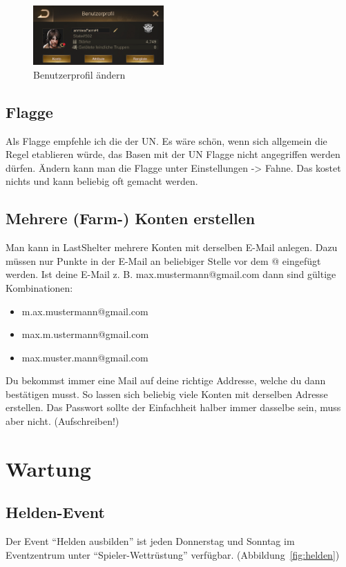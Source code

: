 \documentclass[fontsize=12pt,a4paper]{scrartcl}[2003/01/01]
\begin{document}
\begin{figure}[H] 
  \centering
     \includegraphics[width=5cm]{Bilder/IMG_E0006.JPG}
  \caption{Benutzerprofil ändern}
  \label{fig:benutzer}
\end{figure}

\subsection{Flagge}
Als Flagge empfehle ich die der UN. Es wäre schön, wenn sich allgemein die Regel etablieren würde, das Basen mit der UN Flagge nicht angegriffen werden dürfen.
Ändern kann man die Flagge unter Einstellungen -> Fahne. Das kostet nichts und kann beliebig oft gemacht werden.

\subsection{Mehrere (Farm-) Konten erstellen}
Man kann in LastShelter mehrere Konten mit derselben E-Mail anlegen. Dazu müssen nur Punkte in der E-Mail an beliebiger Stelle vor dem @ eingefügt werden.
Ist deine E-Mail z. B. max.mustermann@gmail.com dann sind gültige Kombinationen: 

\begin{itemize}
  \item m.ax.mustermann@gmail.com
  \item max.m.ustermann@gmail.com
  \item max.muster.mann@gmail.com
\end{itemize}	

Du bekommst immer eine Mail auf deine richtige Addresse, welche du dann bestätigen musst.
So lassen sich beliebig viele Konten mit derselben Adresse erstellen. Das Passwort sollte der Einfachheit halber immer dasselbe sein, muss aber nicht. (Aufschreiben!)


\section{Wartung}

\subsection{Helden-Event}
\label{Heldenevent}
Der Event "`Helden ausbilden"' ist jeden Donnerstag und Sonntag im Eventzentrum unter "`Spieler-Wettrüstung"' verfügbar. (Abbildung~\ref{fig:helden})
\end{document}
